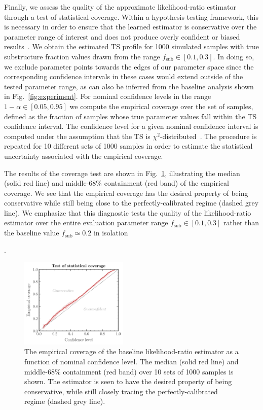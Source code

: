 \documentclass[twocolumn]{aastex631}
\begin{document}
{Finally, we assess the quality of the approximate likelihood-ratio estimator through a test of statistical coverage. Within a hypothesis testing framework, this is necessary in order to ensure that the learned estimator is conservative over the parameter range of interest and does not produce overly confident or biased results~\citep{hermans2021averting}. We obtain the estimated TS profile for 1000 simulated samples with true substructure fraction values drawn from the range $f_\mathrm{sub}\in[0.1, 0.3]$. In doing so, we exclude parameter points towards the edges of our parameter space since the corresponding confidence intervals in these cases would extend outside of the tested parameter range, as can also be inferred from the baseline analysis shown in Fig.~\ref{fig:experiment}. For nominal confidence levels in the range $1-\alpha\in[0.05, 0.95]$ we compute the empirical coverage over the set of samples, defined as the fraction of samples whose true parameter values fall within the TS confidence interval. The confidence level for a given nominal confidence interval is computed under the assumption that the TS is $\chi^2$-distributed~\citep{10.1214/aoms/1177732360}. The procedure is repeated for 10 different sets of 1000 samples in order to estimate the statistical uncertainty associated with the empirical coverage.

The results of the coverage test are shown in Fig.~\ref{fig:coverage}, illustrating the median (solid red line) and middle-68\% containment (red band) of the empirical coverage. We see that the empirical coverage has the desired property of being conservative while still being close to the perfectly-calibrated regime (dashed grey line). We emphasize that this diagnostic tests the quality of the likelihood-ratio estimator over the entire evaluation parameter range $f_\mathrm{sub}\in[0.1, 0.3]$ rather than the baseline value $f_\mathrm{sub}\simeq0.2$ in isolation}.

\begin{figure}[!htbp]
\centering
\includegraphics[width=0.46\textwidth]{coverage}
\caption{{The empirical coverage of the baseline likelihood-ratio estimator as a function of nominal confidence level. The median (solid red line) and middle-68\% containment (red band) over 10 sets of 1000 samples is shown. The estimator is seen to have the desired property of being conservative, while still closely tracing the perfectly-calibrated regime (dashed grey line).}}
\label{fig:coverage}
\end{figure}
    
\end{document}
